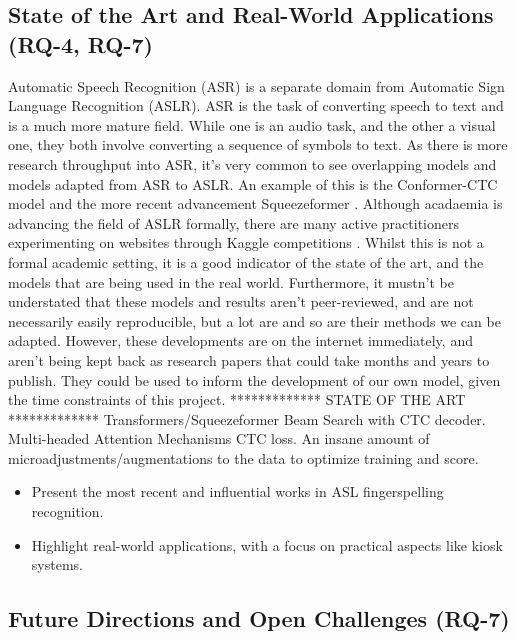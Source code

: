 \subsection{State of the Art and Real-World Applications (RQ-4, RQ-7)}

Automatic Speech Recognition (ASR) is a separate domain from Automatic Sign Language Recognition (ASLR). ASR is the task of converting speech to text and is a much more mature field. While one is an audio task, and the other a visual one, they both involve converting a sequence of symbols to text. As there is more research throughput into ASR, it's very common to see overlapping models and models adapted from ASR to ASLR. An example of this is the Conformer-CTC model \cite{gulatiConformerConvolutionaugmentedTransformer2020} and the more recent advancement Squeezeformer \cite{kimSqueezeformerEfficientTransformer2022}. Although acadaemia is advancing the field of ASLR formally, there are many active practitioners experimenting on websites through Kaggle competitions \cite{kaggleAslFinger}. Whilst this is not a formal academic setting, it is a good indicator of the state of the art, and the models that are being used in the real world.
Furthermore, it mustn't be understated that these models and results aren't peer-reviewed, and are not necessarily easily reproducible, but a lot are and so are their methods we can be adapted. However, these developments are on the internet immediately, and aren't being kept back as research papers that could take months and years to publish. They could be used to inform the development of our own model, given the time constraints of this project.
************* STATE OF THE ART *************
Transformers/Squeezeformer
Beam Search with CTC decoder.
Multi-headed Attention Mechanisms
CTC loss.
An insane amount of microadjustments/augmentations to the data to optimize training and score.

\begin{itemize}
    \item Present the most recent and influential works in ASL fingerspelling recognition.
    \item Highlight real-world applications, with a focus on practical aspects like kiosk systems.
\end{itemize}

\subsection{Future Directions and Open Challenges (RQ-7)}


